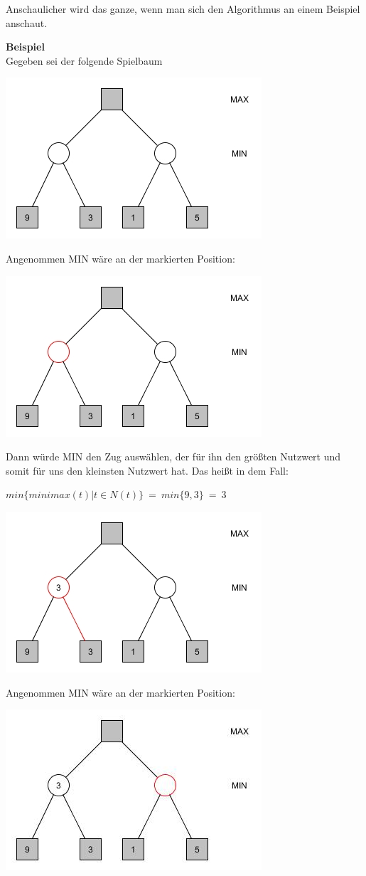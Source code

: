 Anschaulicher wird das ganze, wenn man sich den Algorithmus an einem Beispiel anschaut.

\textbf{Beispiel}\\

Gegeben sei der folgende Spielbaum
\begin{center}
\includegraphics[width = 7 cm]{chapters/minimax/jpg/Graph-Minmax1.jpg}
\end{center}

Angenommen MIN wäre an der markierten Position:
\begin{center}
	\includegraphics[width = 7 cm]{chapters/minimax/jpg/Graph-Minmax2-1.jpg}
\end{center}

Dann würde MIN den Zug auswählen, der für ihn den größten Nutzwert und somit für uns den kleinsten Nutzwert hat. Das heißt in dem Fall:
\begin{center}
	 $min\{minimax(t) | t \in N(t)\} ~=~ min\{9,3\} ~=~ 3$

\includegraphics[width = 7 cm]{chapters/minimax/jpg/Graph-Minmax2-2.jpg}
\end{center}

Angenommen MIN wäre an der markierten Position:
\begin{center}
	\includegraphics[width = 7 cm]{chapters/minimax/jpg/Graph-Minmax2-3.jpg}
\end{center}

